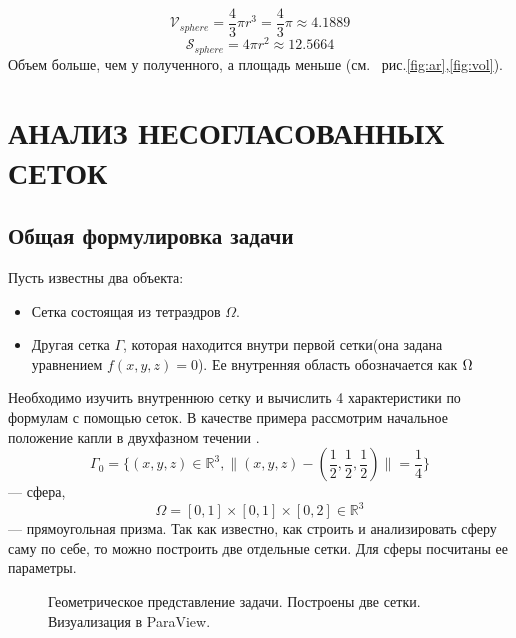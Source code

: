 $$ \mathscr{V}_{sphere} = \frac{4}{3}\pi r^{3} = \frac{4}{3}\pi \approx  4.1889$$
$$ \mathscr{S} _{sphere} = 4 \pi r^{2} \approx 12.5664$$
Объем больше, чем у полученного, а площадь меньше (см.~ рис.\ref{fig:ar},\ref{fig:vol}). 

\chapter{АНАЛИЗ НЕСОГЛАСОВАННЫХ СЕТОК}
\section{Общая формулировка задачи}


Пусть известны два объекта: 
\begin{itemize}
    \item Сетка состоящая из тетраэдров $\Omega$.
    \item Другая сетка $\Gamma $, которая находится внутри первой сетки(она задана уравнением $f(x,y,z) = 0$). Ее внутренняя область обозначается как $\Omega_{\-}$
\end{itemize}
Необходимо изучить внутреннюю сетку и вычислить 4 характеристики по формулам с помощью сеток.  
В качестве примера рассмотрим начальное положение капли в двухфазном течении \cite[c.~34]{ns}. 
$$\Gamma_{0} =\{(x,y,z)\in \mathbb{R}^{3},  \|(x,y,z) - (\frac{1}{2},\frac{1}{2},\frac{1}{2}) \| = \frac{1}{4}\} $$
--- сфера,
$$ \Omega = [0,1]\times [0,1] \times [0,2] \in \mathbb{R}^{3}$$
--- прямоугольная призма.
Так как известно, как строить и анализировать сферу саму по себе, то можно построить две отдельные сетки. Для сферы посчитаны ее параметры.

\begin{figure}[H]
 	\caption{Геометрическое представление задачи. Построены две сетки. Визуализация в ParaView.}
 	\label{fig:problem}
\end{figure}

